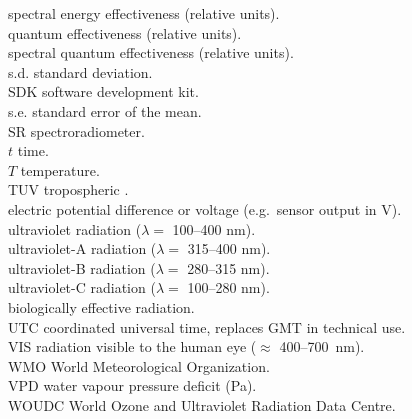 \begin{tabbing}
\seeff  \> spectral energy effectiveness (relative units).\\
\qeff   \> quantum effectiveness (relative units).\\
\sqeff  \> spectral quantum effectiveness (relative units).\\
s.d. \> standard deviation.\\
SDK \> software development kit.\\
s.e. \> standard error of the mean.\\
SR \> spectroradiometer.\\
$t$ \> time.\\
$T$ \> temperature.\\
TUV \> tropospheric \UV.\\
\voltage  \> electric potential difference or voltage (e.g.\ sensor output in V).\\
\UV \> ultraviolet radiation ($\lambda =$ 100--400 nm).\\
\UVA \> ultraviolet-A radiation ($\lambda =$ 315--400 nm).\\
\UVB \> ultraviolet-B radiation ($\lambda =$ 280--315 nm).\\
\UVC \> ultraviolet-C radiation ($\lambda =$ 100--280 nm). \\
\UVeff \> biologically effective \UV radiation.\\
UTC \> coordinated universal time, replaces GMT in technical use.\\
VIS \> radiation visible to the human eye ($\approx$ 400--700~nm).\\
WMO \> World Meteorological Organization.\\
VPD \> water vapour pressure deficit (Pa).\\
WOUDC \> World Ozone and Ultraviolet Radiation Data Centre.\\
\end{tabbing}
